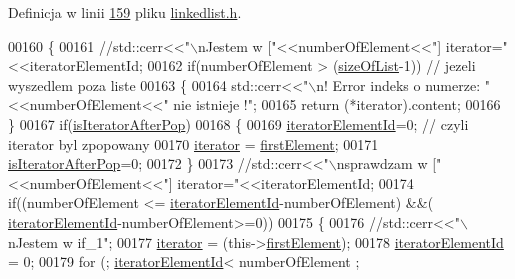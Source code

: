 Definicja w linii \hyperlink{linkedlist_8h_source_l00159}{159} pliku \hyperlink{linkedlist_8h_source}{linkedlist.\-h}.


\begin{DoxyCode}
00160         \{
00161                 \textcolor{comment}{//std::cerr<<"\(\backslash\)nJestem w ["<<numberOfElement<<"] iterator="<<iteratorElementId;}
00162                 \textcolor{keywordflow}{if}(numberOfElement > (\hyperlink{class_linked_list_acfd83fe531d962d6260a633dfca98a9f}{sizeOfList}-1)) \textcolor{comment}{// jezeli wyszedlem poza liste}
00163                         \{
00164                                 std::cerr<<\textcolor{stringliteral}{"\(\backslash\)n! Error indeks o numerze: "}<<numberOfElement<<\textcolor{stringliteral}{" nie istnieje
       !"};
00165                                 \textcolor{keywordflow}{return} (*iterator).content;
00166                         \}
00167                 \textcolor{keywordflow}{if}(\hyperlink{class_linked_list_a8d354ba516e8270027bf617b121b49fe}{isIteratorAfterPop})
00168                         \{
00169                                 \hyperlink{class_linked_list_a6398cec56a986426925e4e651bc4725c}{iteratorElementId}=0;  \textcolor{comment}{// czyli iterator byl zpopowany}
00170                                 \hyperlink{class_linked_list_a6f117a991b3e2e020f43807500b45f5f}{iterator} = \hyperlink{class_linked_list_a51c0816c49528a63eea2adae2d503ada}{firstElement};
00171                                 \hyperlink{class_linked_list_a8d354ba516e8270027bf617b121b49fe}{isIteratorAfterPop}=0;
00172                         \}
00173                 \textcolor{comment}{//std::cerr<<"\(\backslash\)nsprawdzam w ["<<numberOfElement<<"] iterator="<<iteratorElementId;}
00174                 \textcolor{keywordflow}{if}((numberOfElement <= \hyperlink{class_linked_list_a6398cec56a986426925e4e651bc4725c}{iteratorElementId}-numberOfElement) &&(
      \hyperlink{class_linked_list_a6398cec56a986426925e4e651bc4725c}{iteratorElementId}-numberOfElement>=0))
00175                 \{
00176                         \textcolor{comment}{//std::cerr<<"\(\backslash\)nJestem w if\_1";}
00177                         \hyperlink{class_linked_list_a6f117a991b3e2e020f43807500b45f5f}{iterator} = (this->\hyperlink{class_linked_list_a51c0816c49528a63eea2adae2d503ada}{firstElement});
00178                         \hyperlink{class_linked_list_a6398cec56a986426925e4e651bc4725c}{iteratorElementId} = 0;
00179                         \textcolor{keywordflow}{for} (; \hyperlink{class_linked_list_a6398cec56a986426925e4e651bc4725c}{iteratorElementId}< numberOfElement ; 

\end{DoxyCode}
